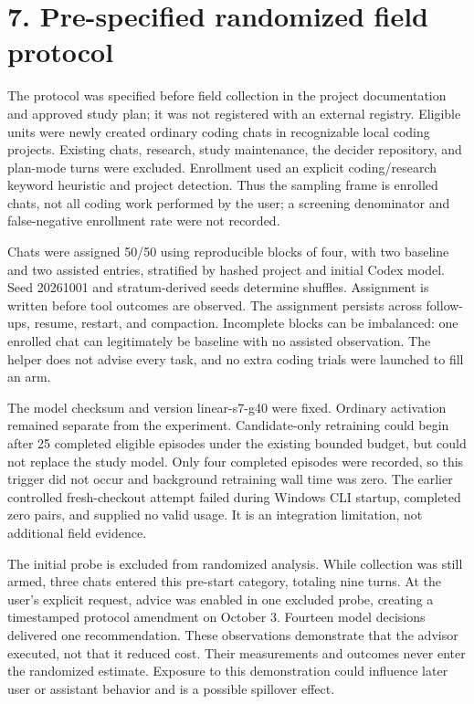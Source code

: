 \documentclass[11pt]{article}
\begin{document}
\section*{7. Pre-specified randomized field protocol}
The protocol was specified before field collection in the project documentation and approved study plan; it was not registered with an external registry. Eligible units were newly created ordinary coding chats in recognizable local coding projects. Existing chats, research, study maintenance, the decider repository, and plan-mode turns were excluded. Enrollment used an explicit coding/research keyword heuristic and project detection. Thus the sampling frame is enrolled chats, not all coding work performed by the user; a screening denominator and false-negative enrollment rate were not recorded.

Chats were assigned 50/50 using reproducible blocks of four, with two baseline and two assisted entries, stratified by hashed project and initial Codex model. Seed 20261001 and stratum-derived seeds determine shuffles. Assignment is written before tool outcomes are observed. The assignment persists across follow-ups, resume, restart, and compaction. Incomplete blocks can be imbalanced: one enrolled chat can legitimately be baseline with no assisted observation. The helper does not advise every task, and no extra coding trials were launched to fill an arm.

The model checksum and version linear-s7-g40 were fixed. Ordinary activation remained separate from the experiment. Candidate-only retraining could begin after 25 completed eligible episodes under the existing bounded budget, but could not replace the study model. Only four completed episodes were recorded, so this trigger did not occur and background retraining wall time was zero. The earlier controlled fresh-checkout attempt failed during Windows CLI startup, completed zero pairs, and supplied no valid usage. It is an integration limitation, not additional field evidence.

The initial probe is excluded from randomized analysis. While collection was still armed, three chats entered this pre-start category, totaling nine turns. At the user's explicit request, advice was enabled in one excluded probe, creating a timestamped protocol amendment on October 3. Fourteen model decisions delivered one recommendation. These observations demonstrate that the advisor executed, not that it reduced cost. Their measurements and outcomes never enter the randomized estimate. Exposure to this demonstration could influence later user or assistant behavior and is a possible spillover effect.
\end{document}
